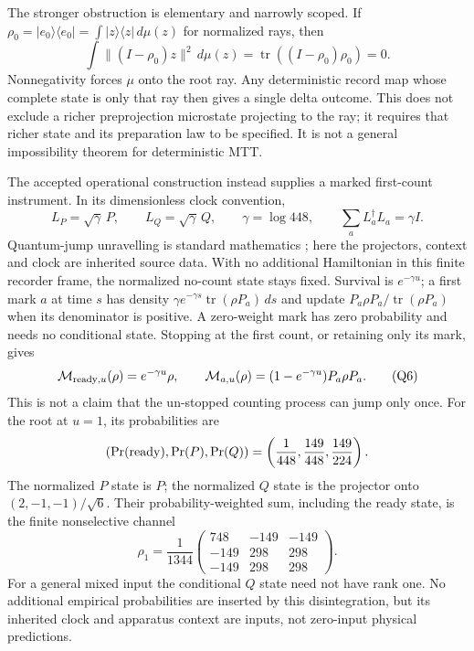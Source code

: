 \documentclass[11pt,a4paper]{article}
\begin{document}
The stronger obstruction is elementary and narrowly scoped. If
\(\rho_0=|e_0\rangle\langle e_0|=\int |z\rangle\langle z|\,d\mu(z)\)
for normalized rays, then
\[
 \int\|(I-\rho_0)z\|^2\,d\mu(z)
 =\operatorname{tr}((I-\rho_0)\rho_0)=0 .
\]
Nonnegativity forces \(\mu\) onto the root ray. Any deterministic record
map whose complete state is only that ray then gives a single delta
outcome. This does not exclude a richer preprojection microstate projecting
to the ray; it requires that richer state and its preparation law to be
specified. It is not a general impossibility theorem for deterministic MTT.

The accepted operational construction instead supplies a marked
first-count instrument. In its dimensionless clock convention,
\[
 L_P=\sqrt{\gamma}\,P,\qquad L_Q=\sqrt{\gamma}\,Q,
 \qquad \gamma=\log448,\qquad \sum_aL_a^\dagger L_a=\gamma I .
\]
Quantum-jump unravelling is standard mathematics
\cite{PlenioKnight1998}; here the projectors, context and clock are
inherited source data. With no additional Hamiltonian in this finite
recorder frame, the normalized no-count state stays fixed. Survival is
\(e^{-\gamma u}\); a first mark \(a\) at time \(s\) has density
\(\gamma e^{-\gamma s}\operatorname{tr}(\rho P_a)\,ds\) and update
\(P_a\rho P_a/\operatorname{tr}(\rho P_a)\) when its denominator is positive.
A zero-weight mark has zero probability and needs no conditional state.
Stopping at the first count, or retaining only its mark, gives
\begin{equation}
 \mathcal M_{{\rm ready},u}(\rho)=e^{-\gamma u}\rho,\qquad
 \mathcal M_{a,u}(\rho)=(1-e^{-\gamma u})P_a\rho P_a .
 \tag{Q6}\label{eq:q79-path-instrument}
\end{equation}
This is not a claim that the un-stopped counting process can jump only
once. For the root at \(u=1\), its probabilities are
\[
 (\Pr({\rm ready}),\Pr(P),\Pr(Q))
 =\left(\frac1{448},\frac{149}{448},\frac{149}{224}\right).
\]
The normalized \(P\) state is \(P\); the normalized \(Q\) state is the
projector onto \((2,-1,-1)/\sqrt6\). Their probability-weighted sum,
including the ready state, is the finite nonselective channel
\begin{equation}
 \rho_1=\frac1{1344}
 \begin{pmatrix}
 748&-149&-149\\
 -149&298&298\\
 -149&298&298
 \end{pmatrix}.
 \tag{Q7}\label{eq:q79-record-state}
\end{equation}
For a general mixed input the conditional \(Q\) state need not have rank
one. No additional empirical probabilities are inserted by this
disintegration, but its inherited clock and apparatus context are inputs,
not zero-input physical predictions.
\end{document}
